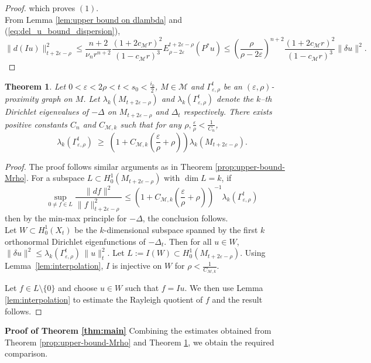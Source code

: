 \documentclass[10 pt, reqno]{amsart}
\newcommand{\M}{\mathcal{M}}
\newcommand{\lk}{\lambda_k}%
\newtheorem{theorem}{Theorem}[section]
\theoremstyle{definition}
\numberwithin{equation}{section}
\newcommand{\MMM}{\mathcal{M}}
\begin{document}
\begin{proof}
which proves $(1)$.\\
From Lemma \ref{lem:upper bound on dlambda} and (\ref{eq:del_u_bound_dispersion}),
\[\|d(Iu)\|_{t+2\varepsilon-\rho}^2\le \frac{n+2}{\nu_{n}r^{n+2}} \frac{(1+ 2c_\MMM r)^2}{(1-c_\MMM r)^3
     }E_{\rho-2\varepsilon}^{t+2\varepsilon-\rho}(P^*u)\le \left(\frac{\rho}{\rho-2\varepsilon}\right)^{n+2}\frac{(1+ 2c_\MMM r)^2}{(1-c_\MMM r)^3
     }\|\delta u\|^2.\]

\end{proof}
\begin{theorem}
\label{thm:lower_bound}
Let $0<\varepsilon<2\rho< t<s_0<\frac{i_0}{2}$, $M\in \M$ and $\Gamma^t_{\varepsilon,\rho}$ be an $(\varepsilon,\rho)$-proximity graph on $M$. 
Let $\lambda_k(M_{t+2\varepsilon-\rho})$ and $\lk(\Gamma^t_{\varepsilon,\rho})$ denote the $k$--th Dirichlet eigenvalues of $-\Delta$ on $M_{t+2\varepsilon-\rho}$ and $\Delta_t$ respectively.  There exists positive constants $C_n$ and $C_{\M,k}$ such that for any $\rho,\frac{\varepsilon}{\rho}<\frac{1}{C_n}$,
\[
\lambda_k(\Gamma^t_{\varepsilon,\rho})
\;\ge\;
\left(1+C_{\M,k}\left(\frac{\varepsilon}{\rho}+\rho\right)\right)\lk(M_{t+2\varepsilon-\rho}).
\]



\end{theorem}
\begin{proof}
    The proof follows similar arguments as in Theorem \ref{prop:upper-bound-Mrho}. 
    For a subspace $L\subset H^1_0(M_{t+2\varepsilon-\rho})$ with $\dim L=k$, if
\[
\sup_{0\neq f\in L}
\frac{\|df\|^2}{\|f\|_{t+2\varepsilon-\rho}^2}
\le
\left(1+C_{\M,k}\left(\frac{\varepsilon}{\rho}+\rho\right)\right)^{-1}\lk(\Gamma^t_{\varepsilon,\rho})
\]
then by the min-max principle for $-\Delta$, the conclusion follows.\\
Let $W\subset H_0^1(X_{t})$ be the $k$-dimensional subspace spanned by the first $k$ orthonormal Dirichlet eigenfunctions of $-\Delta_t$.
Then for all $u\in W$, $\|\delta u\|^2
\le
\lambda_k(\Gamma^t_{\varepsilon,\rho})\,\|u\|_{t}^2.$
Let $L := I(W)\subset H^1_0(M_{t+2\varepsilon-\rho}).$   
Using Lemma~\ref{lem:interpolation},  $I$ is injective on $W$ for $\rho<\frac{1}{C_{\M,k}}$.

Let $f\in L\setminus\{0\}$ and choose $u\in W$ such that $f=Iu$. 
We then use Lemma \ref{lem:interpolation} to estimate the Rayleigh quotient of $f$ and the result follows.

\end{proof}
\textbf{Proof of Theorem \ref{thm:main}} Combining the estimates obtained from Theorem \ref{prop:upper-bound-Mrho} and Theorem \ref{thm:lower_bound}, we obtain the required comparison.\\
\end{document}
